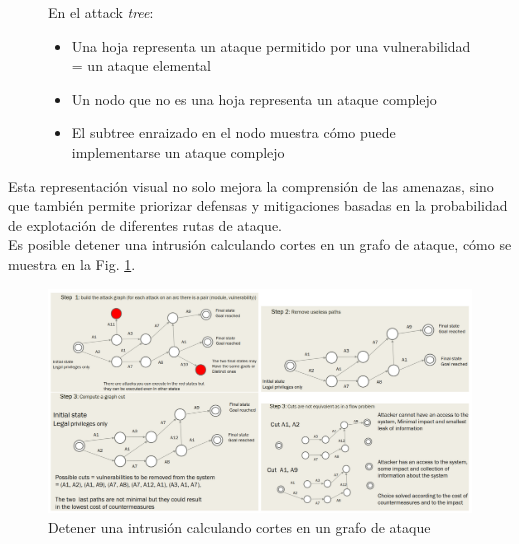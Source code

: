 \begin{enumerate}[resume]
\begin{figure}[htbp]
   {En el attack \textit{tree}:\ns
      \begin{itemize}
         \item Una hoja representa un ataque permitido por una vulnerabilidad = un ataque elemental
         \item Un nodo que no es una hoja representa un ataque complejo
         \item El subtree enraizado en el nodo muestra cómo puede implementarse un ataque complejo
      \end{itemize}}
\end{figure}

Esta representación visual no solo mejora la comprensión de las amenazas, sino que también permite priorizar defensas y mitigaciones basadas en la probabilidad de explotación de diferentes rutas de ataque.\\
Es posible detener una intrusión calculando cortes en un grafo de ataque, cómo se muestra en la Fig. \ref{fig:00/graphintrusions}.\\
\newpage
\begin{figure}[htbp]
   \centering
   \includegraphics[width=0.9\columnwidth]{images/00/graphintrusions.png}
   \caption{Detener una intrusión calculando cortes en un grafo de ataque}
   \label{fig:00/graphintrusions}
\end{figure}


\end{enumerate}
